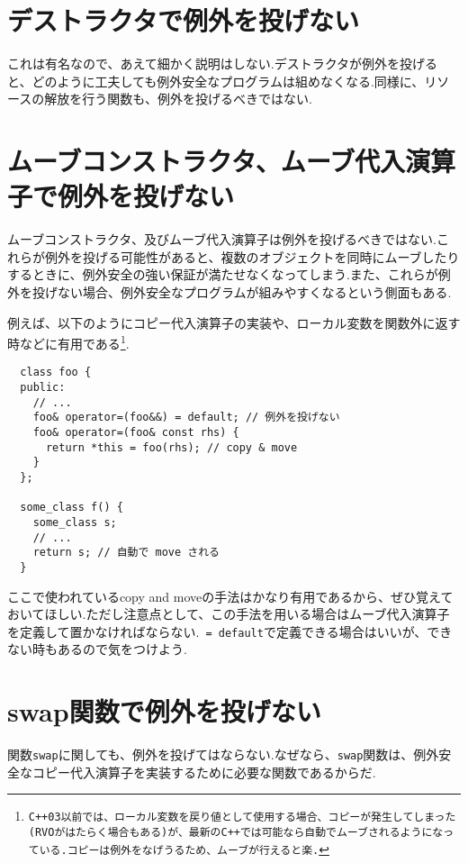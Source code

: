 \documentclass[a4j,11pt,openright]{jsbook}
\begin{document}
\section{デストラクタで例外を投げない}

これは有名なので、あえて細かく説明はしない.デストラクタが例外を投げると、どのように工夫しても例外安全なプログラムは組めなくなる.同様に、リソースの解放を行う関数も、例外を投げるべきではない.

\section{ムーブコンストラクタ、ムーブ代入演算子で例外を投げない}

ムーブコンストラクタ、及びムーブ代入演算子は例外を投げるべきではない.これらが例外を投げる可能性があると、複数のオブジェクトを同時にムーブしたりするときに、例外安全の強い保証が満たせなくなってしまう.また、これらが例外を投げない場合、例外安全なプログラムが組みやすくなるという側面もある.

例えば、以下のようにコピー代入演算子の実装や、ローカル変数を関数外に返す時などに有用である\footnote{\texttt{C++03以前では、ローカル変数を戻り値として使用する場合、コピーが発生してしまった(RVOがはたらく場合もある)が、最新のC++では可能なら自動でムーブされるようになっている.コピーは例外をなげうるため、ムーブが行えると楽.}}.

\begin{verbatim}
  class foo {
  public:
    // ...
    foo& operator=(foo&&) = default; // 例外を投げない
    foo& operator=(foo& const rhs) {
      return *this = foo(rhs); // copy & move
    }
  };

  some_class f() {
    some_class s;
    // ...
    return s; // 自動で move される
  }
\end{verbatim}

ここで使われているcopy and moveの手法はかなり有用であるから、ぜひ覚えておいてほしい.ただし注意点として、この手法を用いる場合はムーブ代入演算子を定義して置かなければならない.\ \verb|= default|で定義できる場合はいいが、できない時もあるので気をつけよう.

\section{swap関数で例外を投げない}

関数\verb|swap|に関しても、例外を投げてはならない.なぜなら、\verb|swap|関数は、例外安全なコピー代入演算子を実装するために必要な関数であるからだ.
\end{document}
